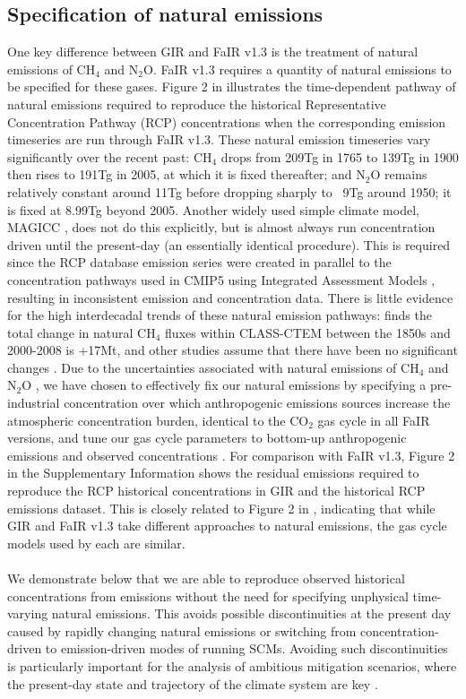 \documentclass[gmd, manuscript]{copernicus}
\begin{document}
\subsection*{Specification of natural emissions}
One key difference between GIR and FaIR v1.3 is the treatment of natural emissions of CH$_4$ and N$_2$O. FaIR v1.3 requires a quantity of natural emissions to be specified for these gases. Figure 2 in \cite{Smith2017} illustrates the time-dependent pathway of natural emissions required to reproduce the historical Representative Concentration Pathway (RCP) concentrations when the corresponding emission timeseries \citep{Meinshausen2011c} are run through FaIR v1.3. These natural emission timeseries vary significantly over the recent past: CH$_4$ drops from 209Tg in 1765 to 139Tg in 1900 then rises to 191Tg in 2005, at which it is fixed thereafter; and N$_2$O remains relatively constant around 11Tg before dropping sharply to ~9Tg around 1950; it is fixed at 8.99Tg beyond 2005. Another widely used simple climate model, MAGICC \citep{Meinshausen2011}, does not do this explicitly, but is almost always run concentration driven until the present-day (an essentially identical procedure). This is required since the RCP database emission series were created in parallel to the concentration pathways used in CMIP5 using Integrated Assessment Models \citep{Moss2010}, resulting in inconsistent emission and concentration data. There is little evidence for the high interdecadal trends of these natural emission pathways: \cite{Arora2018} finds the total change in natural CH$_4$ fluxes within CLASS-CTEM between the 1850s and 2000-2008 is +17Mt, and other studies assume that there have been no significant changes \citep{Holmes2013,Prather2012}. Due to the uncertainties associated with natural emissions of CH$_4$ and N$_2$O \citep{Turner2019,Davidson2014}, we have chosen to effectively fix our natural emissions by specifying a pre-industrial concentration over which anthropogenic emissions sources increase the atmospheric concentration burden, identical to the CO$_2$ gas cycle in all FaIR versions, and tune our gas cycle parameters to bottom-up anthropogenic emissions \citep{Gutschow2016,Quere2018} and observed concentrations \citep{Meinshausen2017}. For comparison with FaIR v1.3, Figure 2 in the Supplementary Information shows the residual emissions required to reproduce the RCP historical concentrations in GIR and the historical RCP emissions dataset. This is closely related to Figure 2 in \cite{Smith2017}, indicating that while GIR and FaIR v1.3 take different approaches to natural emissions, the gas cycle models used by each are similar.\\\\
We demonstrate below that we are able to reproduce observed historical concentrations from emissions without the need for specifying unphysical time-varying natural emissions. This avoids possible discontinuities at the present day caused by rapidly changing natural emissions or switching from concentration-driven to emission-driven modes of running SCMs. Avoiding such discontinuities is particularly important for the analysis of ambitious mitigation scenarios, where the present-day state and trajectory of the climate system are key \citep{Leach2018}.
\end{document}
